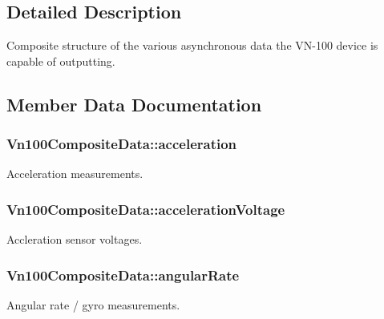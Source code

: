 \subsection{Detailed Description}
Composite structure of the various asynchronous data the V\+N-\/100 device is capable of outputting. 

\subsection{Member Data Documentation}
\subsubsection[{\texorpdfstring{acceleration}{acceleration}}]{ Vn100\+Composite\+Data\+::acceleration}\hypertarget{structVn100CompositeData_a3f4694adc6d229f9381e7dc3a8350e57}{}\label{structVn100CompositeData_a3f4694adc6d229f9381e7dc3a8350e57}
Acceleration measurements. 
\subsubsection[{\texorpdfstring{acceleration\+Voltage}{accelerationVoltage}}]{ Vn100\+Composite\+Data\+::acceleration\+Voltage}\hypertarget{structVn100CompositeData_af1ea7e2c27d06a5d30cf662c807b3c12}{}\label{structVn100CompositeData_af1ea7e2c27d06a5d30cf662c807b3c12}
Accleration sensor voltages. 
\subsubsection[{\texorpdfstring{angular\+Rate}{angularRate}}]{ Vn100\+Composite\+Data\+::angular\+Rate}\hypertarget{structVn100CompositeData_a48701e60838a8d019d79b59a3019ded0}{}\label{structVn100CompositeData_a48701e60838a8d019d79b59a3019ded0}
Angular rate / gyro measurements. 
